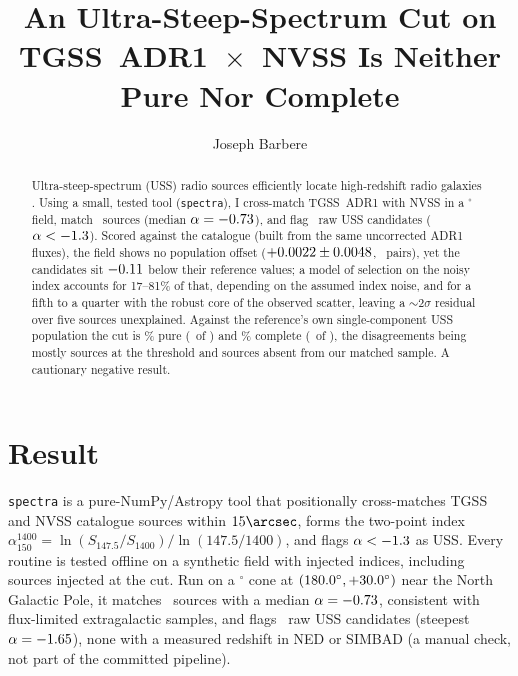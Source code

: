 \documentclass[RNAAS]{aastex631}
\newcommand{\code}[1]{\texttt{#1}}
\begin{document}
\title{An Ultra-Steep-Spectrum Cut on TGSS~ADR1~$\times$~NVSS Is Neither Pure Nor
Complete}

\author[0009-0008-3289-4447]{Joseph Barbere}

\begin{abstract}
Ultra-steep-spectrum (USS) radio sources efficiently locate high-redshift radio
galaxies \citep{debreuck2000}. Using a small, tested tool (\code{spectra}), I
cross-match TGSS~ADR1 \citep{intema2017} with NVSS \citep{condon1998} in a
\usRadius$^\circ$ field, match \usNmatched\ sources (median $\alpha=-0.73$),
and flag \usNuss\ raw USS candidates ($\alpha<-1.3$). Scored against the
\citet{degasperin2018} catalogue (built from the same uncorrected ADR1 fluxes), the
field shows no population offset ($+0.0022\pm0.0048$,
\usRealNPairs\ pairs), yet the candidates sit $-0.11$ below their reference
values; a model of selection on the noisy index accounts for 17--81\% of that, depending on
the assumed index noise, and for a fifth to a quarter with the robust core of the observed scatter,
leaving a $\sim$2$\sigma$ residual over five sources unexplained. Against the reference's own single-component USS population the cut is
\usRealPurityPct\% pure (\usRealNFlaggedRefUss\ of \usNuss) and \usRealCompletenessPct\%
complete (\usRealNRefUssRec\ of \usRealNRefUss), the disagreements being mostly sources at the
threshold and sources absent from our matched sample. A cautionary negative result.
\end{abstract}

\section{Result}

\code{spectra} \citep{janskyresearch} is a pure-NumPy/Astropy tool that positionally
cross-matches TGSS and NVSS catalogue sources within $15\arcsec$, forms the two-point
index $\alpha_{150}^{1400}=\ln(S_{147.5}/S_{1400})/\ln(147.5/1400)$, and flags
$\alpha<-1.3$ as USS. Every routine is tested offline on a synthetic field
with injected indices, including sources injected at the cut. Run on a
\usRadius$^\circ$ cone at $(180.0^\circ,+30.0^\circ)$ near the North
Galactic Pole, it matches \usNmatched\ sources with a median $\alpha=-0.73$,
consistent with flux-limited extragalactic samples, and flags \usNuss\ raw USS
candidates (steepest $\alpha=-1.65$), none with a measured redshift in NED or
SIMBAD (a manual check, not part of the committed pipeline).
\end{document}
